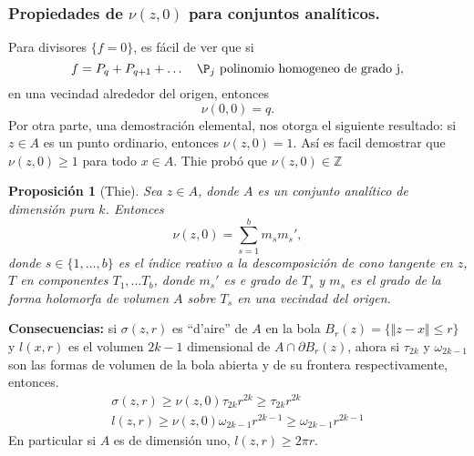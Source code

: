 \documentclass[letterpaper]{article}
\newtheorem{prop}[teorema]{Proposici\'on}
\newcommand{\zah}{\ensuremath{ \mathbb Z }}
\begin{document}
\subsubsection{Propiedades de \(\nu(z,0)\) para conjuntos analíticos.}
\label{sec:org58dc540}
Para divisores \(\{f=0\}\), es fácil de ver que si
\[
    f=P_q+P_{q+1}+\dots\quad\P_j\text{ polinomio homogeneo de grado j},
\]
\noindent en una vecindad alrededor del origen, entonces
\[
    \nu(0,0)=q.
\]
Por otra parte, una demostración elemental, nos otorga el siguiente resultado: si \(z\in A\) es un punto ordinario, entonces \(\nu(z,0)=1\). Así es facil demostrar que \(\nu(z,0)\geq1\) para todo \(x\in A\). Thie probó que \(\nu(z,0)\in\zah\)
\begin{prop}[Thie]\label{thie}
Sea \(z\in A\), donde \(A\) es un conjunto analítico de dimensión pura \(k\). Entonces
\[
    \nu(z,0)=\sum^{b}_{s=1}m_{s} m_{s}',
\]
\noindent donde \(s\in\{1,\dots,b\}\) es el índice reativo a la descomposición de cono tangente en \(z\), \(T\) en componentes \(T_1,\dots T_b\), donde \(m_s'\) es e grado de \(T_s\) y \(m_s\) es el grado de la forma holomorfa de volumen \(A\) sobre \(T_s\) en una vecindad del origen.
\end{prop}
\textbf{Consecuencias:}
si \(\sigma(z,r)\) es ``d'aire'' de \(A\) en la bola \(B_r(z)=\{\Vert z-x\Vert\leq r\}\) y \(l(x,r)\) es el volumen \(2k-1\) dimensional de \(A\cap\partial B_r(z)\), ahora si \(\tau_{2k}\) y \(\omega_{2k-1}\) son las formas de volumen de la bola abierta y de su frontera respectivamente, entonces.
\begin{align*}
\sigma(z,r)\geq\nu(z,0)\tau_{2k}r^{2k}\geq\tau_{2k}r^{2k}\\
l(z,r)\geq\nu(z,0)\omega_{2k-1}r^{2k-1}\geq\omega_{2k-1}r^{2k-1}
\end{align*}
\noindent En particular si \(A\) es de dimensión uno, \(l(z,r)\geq2\pi r\).
\end{document}
